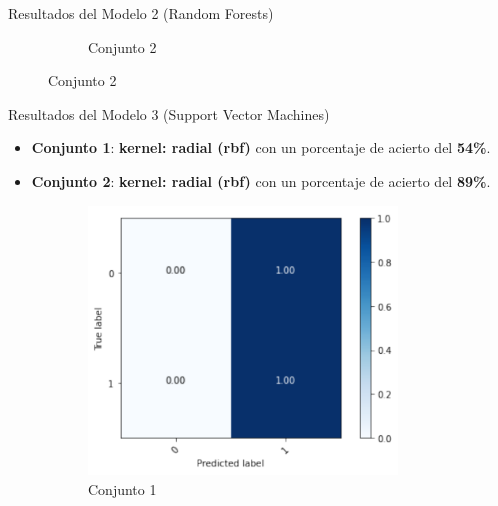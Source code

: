 \documentclass[10pt]{beamer}
\begin{document}
\begin{frame}{Resultados del Modelo 2 (Random Forests)}
\begin{figure}[!htb]
\begin{subfigure}[b]{0.45\linewidth}
	    \caption{Conjunto 2}
	\end{subfigure}
  \end{figure}
\end{frame}

\begin{frame}{Resultados del Modelo 3 (Support Vector Machines)}
  \begin{itemize}
  	\item \textbf{Conjunto 1}: \textbf{kernel: radial (rbf)} con un porcentaje de acierto del \textbf{54\%}.
  	\item \textbf{Conjunto 2}: \textbf{kernel: radial (rbf)} con un porcentaje de acierto del \textbf{89\%}.
  \end{itemize}
  \begin{figure}[!htb]
    \begin{subfigure}[b]{0.45\linewidth}
    	\centering
	    \includegraphics[width=0.9\textwidth]{images/resultados_svm_cm_conjunto1.png}
	    \caption{Conjunto 1}
	\end{subfigure}
	\begin{subfigure}[b]{0.45\linewidth} 
		\centering

\end{subfigure}
\end{figure}
\end{frame}
\end{document}
